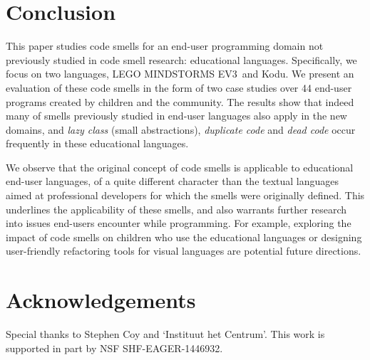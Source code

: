 \documentclass[conference]{IEEEtran}
\newcommand{\ms}{LEGO MINDSTORMS EV3}
\begin{document}
\section{Conclusion}
\label{sec:conclusions}
This paper studies code smells for an end-user programming domain not previously studied in code smell research: educational languages. Specifically, we focus on two languages, \ms~and Kodu. We present an evaluation of these code smells in the form of two case studies over 44 end-user programs created by children and the community. The results show that indeed many of smells previously studied in end-user languages also apply in the new domains, and \emph{lazy class} (small abstractions), \emph{duplicate code} and \emph{dead code} occur frequently in these educational languages. 
%

We observe that the original concept of code smells is applicable to educational end-user languages, of a quite different character than the textual languages aimed at professional developers for which the smells were originally defined. This underlines the applicability of these smells, and also warrants further research into issues end-users encounter while programming. For example, exploring the impact of code smells on children who use the educational languages or designing user-friendly refactoring tools for visual languages are potential future directions. 

\balance

\section*{Acknowledgements}
Special thanks to Stephen Coy and `Instituut het Centrum'. This work is supported in part by  NSF SHF-EAGER-1446932.




\end{document}
